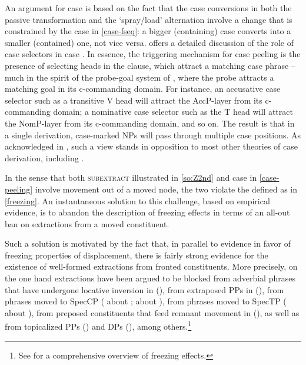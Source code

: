 \vskip -1cm

\noindent An argument for case  is based on the fact that the case conversions in both the passive transformation and the  `spray/load' alternation involve a change that is constrained by the case  in \ref{case-fseq}: a bigger (containing) case converts into a smaller (contained) one, not vice versa. \citet[143--146]{Caha2009} offers a detailed discussion of the role of case selectors in case . In essence, the triggering mechanism for case peeling is the presence of selecting heads in the clause, which attract a matching case phrase -- much in the spirit of the probe-goal system of \cite{Chomsky2000}, where the probe attracts a matching goal in its c-commanding domain. For instance, an accusative case selector such as a transitive V head will attract the AccP-layer from its c-commanding domain; a nominative case selector such as the T head will attract the NomP-layer from its c-commanding domain, and so on. The result is that in a single derivation, case-marked NPs will pass through multiple case positions.  As acknowledged in \citet[146]{Caha2009}, such a view stands in opposition to most other theories of case derivation, including \cite{Chomsky2000}. 
\par
In the sense that both \textsc{subextract} illustrated in \ref{so:Z2nd} and case  in \ref{case-peeling} involve movement out of a moved node, the two violate the  defined as in \ref{freezing}. An instantaneous solution to this challenge, based on empirical evidence, is to abandon the description of freezing effects in terms of an all-out ban on extractions from a moved constituent. 
\par
Such a solution is motivated by the fact that, in parallel to evidence in favor of freezing properties of displacement, there is fairly strong evidence for the existence of well-formed extractions from fronted constituents. More precisely, on the one hand extractions have been argued to be blocked from adverbial phrases that have undergone locative inversion in  (\citealt{Huy1976}), from extraposed PPs in  (\citealt{Wexler-Culicover1980}), from phrases moved to SpecCP (\citealt{LS1992} about ;  \citealt{Fanselow1987,Grewendorf1989,Muller1998,Muller2010} about ), from phrases moved to SpecTP (\citealt{Browning1991,Collins1994,BG2007} about ), from preposed constituents that feed remnant movement in  (\citealt{Muller1998}), as well as from  topicalized PPs (\citealt{Postal1972}) and DPs (\citealt{LS1992}), among others.\footnote{See \cite{Corver2017} for a comprehensive overview of freezing effects. 
} %
